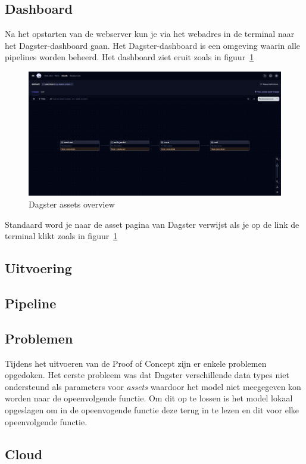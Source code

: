 \subsection{Dashboard}
Na het opstarten van de webserver kun je via het webadres in de terminal naar het Dagster-dashboard gaan. Het Dagster-dashboard is een omgeving waarin alle pipelines worden beheerd.
Het dashboard ziet eruit zoals in figuur~\ref{fig:Dagser_assets}
\begin{figure}
    \centering
    \includegraphics[width=0.9\linewidth]{graphics/Dagster_Assets.PNG}
    \caption{Dagster assets overview}
    \label{fig:Dagser_assets}
\end{figure}
Standaard word je naar de asset pagina van Dagster verwijst als je op de link de terminal klikt zoals in figuur~\ref{fig:Dagser_assets}
\subsection{Uitvoering}

\subsection{Pipeline}
\subsection{Problemen}
Tijdens het uitvoeren van de Proof of Concept zijn er enkele problemen opgedoken.
Het eerste probleem was dat Dagster verschillende data types niet ondersteund als parameters voor \textit{assets} waardoor het model niet meegegeven kon worden naar de opeenvolgende functie. Om dit op te lossen is het model lokaal opgeslagen om in de opeenvogende functie deze terug in te lezen en dit voor elke opeenvolgende functie.
\subsection{Cloud}